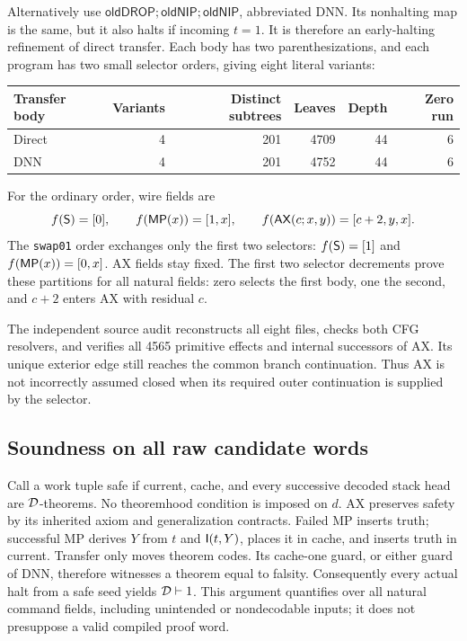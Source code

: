 Alternatively use
$\mathsf{oldDROP};\mathsf{oldNIP};\mathsf{oldNIP}$, abbreviated
DNN. Its nonhalting map is the same, but it also halts if incoming
$t=1$. It is therefore an early-halting refinement of direct transfer.
Each body has two parenthesizations, and each program has two small
selector orders, giving eight literal variants:
\begin{center}
\begin{tabular}{lrrrrr}
\toprule
Transfer body&Variants&Distinct subtrees&Leaves&Depth&Zero run\\
\midrule
Direct&4&201&4709&44&6\\
DNN&4&201&4752&44&6\\
\bottomrule
\end{tabular}
\end{center}
For the ordinary order, wire fields are
\[
 f(\mathsf S)=[0],\qquad f(\mathsf{MP}(x))=[1,x],\qquad
 f(\mathsf{AX}(c;x,y))=[c+2,y,x].
\]
The \texttt{swap01} order exchanges only the first two selectors:
$f(\mathsf S)=[1]$ and $f(\mathsf{MP}(x))=[0,x]$. AX fields stay fixed.
The first two selector decrements prove these partitions for all
natural fields: zero selects the first body, one the second, and
$c+2$ enters AX with residual $c$.

The independent source audit reconstructs all eight files, checks both
CFG resolvers, and verifies all 4565 primitive effects and internal
successors of AX. Its unique exterior edge still reaches the common
branch continuation. Thus AX is not incorrectly assumed closed when
its required outer continuation is supplied by the selector.

\subsection{Soundness on all raw candidate words}

Call a work tuple safe if current, cache, and every successive decoded
stack head are $\mathcal D$-theorems. No theoremhood condition is imposed
on $d$. AX preserves safety by its inherited axiom and generalization
contracts. Failed MP inserts truth; successful MP derives $Y$ from
$t$ and $\mathsf I(t,Y)$, places it in cache, and inserts truth in current.
Transfer only moves theorem codes. Its cache-one guard, or either guard
of DNN, therefore witnesses a theorem equal to falsity. Consequently
every actual halt from a safe seed yields $\mathcal D\vdash1$. This argument
quantifies over all natural command fields, including unintended or
nondecodable inputs; it does not presuppose a valid compiled proof word.

